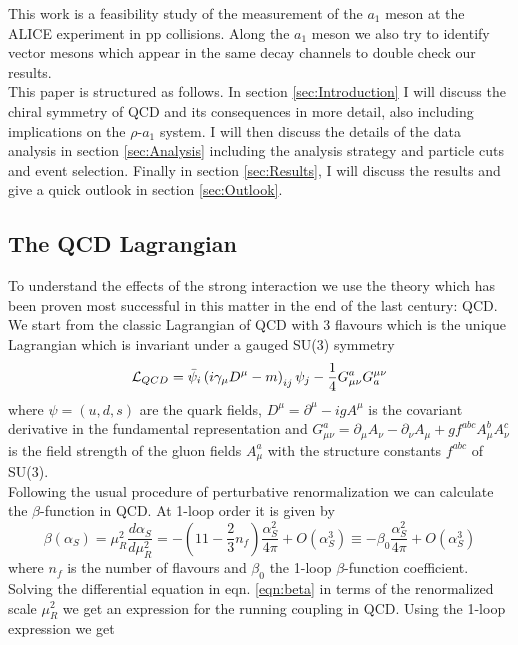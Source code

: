 This work is a feasibility study of the measurement of the $a_1$ meson at the ALICE experiment in pp collisions. Along the $a_1$ meson we also try to identify vector mesons which appear in the same decay channels to double check our results. \\
This paper is structured as follows. In section \ref{sec:Introduction} I will discuss the chiral symmetry of QCD and its consequences in more detail, also including implications on the $\rho$-$a_1$ system. I will then discuss the details of the data analysis in section \ref{sec:Analysis} including the analysis strategy and particle cuts and event selection. Finally in section \ref{sec:Results}, I will discuss the results and give a quick outlook in section \ref{sec:Outlook}.

\subsection{The QCD Lagrangian}
To understand the effects of the strong interaction we use the theory which has been proven most successful in this matter in the end of the last century: QCD. We start from the classic Lagrangian of QCD with 3 flavours which is the unique Lagrangian which is invariant under a gauged SU(3) symmetry
\begin{equation}
\label{eqn:LQCD}
\mathcal{L}_{QCD} = \bar{\psi}_i \left( i\gamma_{\mu} D^{\mu} - m \right)_{ij} \psi_j - \frac{1}{4} G_{\mu\nu}^a G^{\mu\nu}_a
\end{equation}
where $\psi = \left( u,d,s \right)$ are the quark fields, $D^{\mu} = \partial^{\mu} -igA^{\mu}$ is the covariant derivative in the fundamental representation and $G_{\mu\nu}^a = \partial_{\mu}A_{\nu} - \partial_{\nu}A_{\mu} + g f^{abc} A_{\mu}^b A_{\nu}^c$ is the field strength of the gluon fields $A_{\mu}^a$ with the structure constants $f^{abc}$ of SU(3). \\
Following the usual procedure of perturbative renormalization we can calculate the $\beta$-function in QCD. At 1-loop order it is given by \cite{QCDEllis}
\begin{equation}
\label{eqn:beta}
\beta(\alpha_S) = \mu_R^2 \frac{d\alpha_S}{d\mu_R^2} = - \left( 11 - \frac{2}{3} n_f \right) \frac{\alpha_S^2}{4\pi} + O(\alpha_S^3)  \equiv - \beta_0 \frac{\alpha_S^2}{4\pi} + O(\alpha_S^3)
\end{equation}
where $n_f$ is the number of flavours and $\beta_0$ the 1-loop $\beta$-function coefficient.
Solving the differential equation in eqn. \ref{eqn:beta} in terms of the renormalized scale $\mu_R^2$ we get an expression for the running coupling in QCD. Using the 1-loop expression we get
